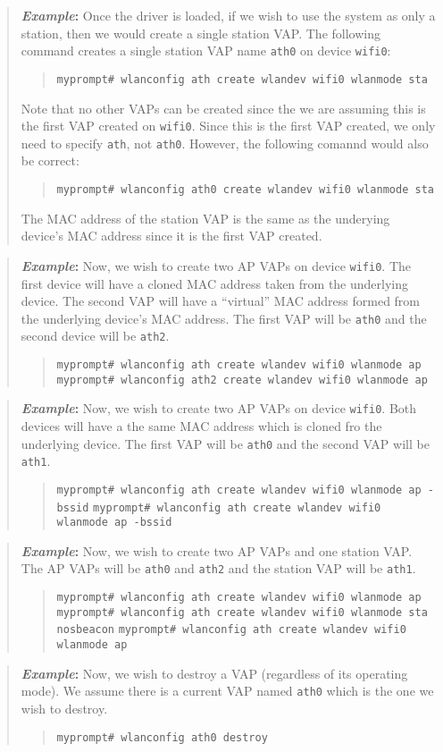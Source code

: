 \documentclass[10pt,fullpage]{article}
\newcommand{\mytt}[1]{{\texttt{#1}}}
\newcommand{\bv}{\begin{verse}}
\newcommand{\ev}{\end{verse}}
\newcommand{\cmd}[1]{{\texttt{myprompt\# #1}}}
\newenvironment{example}{\begin{quote}\textbf{\textit{Example}:}}{\end{quote}}
\begin{document}
\begin{example}
  Once the driver is loaded, if we wish to use the system as only a
  station, then we would create a single station VAP.  The following
  command creates a single station VAP name \mytt{ath0} on device
  \mytt{wifi0}:
  \bv
  \cmd{wlanconfig ath create wlandev wifi0 wlanmode sta}
  \ev
  Note that no other VAPs can be created since the we are assuming
  this is the first VAP created on \mytt{wifi0}.  Since this is the
  first VAP created, we only need to specify \mytt{ath}, not
  \mytt{ath0}.  However, the following comannd would also be correct:
  \bv
  \cmd{wlanconfig ath0 create wlandev wifi0 wlanmode sta}
  \ev
  The MAC address of the station VAP is the same as the underying
  device's MAC address since it is the first VAP created.
\end{example}
\begin{example}
  Now, we wish to create two AP VAPs on device \mytt{wifi0}.  The first
  device will have a cloned MAC address taken from the underlying
  device. The second VAP will have a ``virtual'' MAC address formed
  from the underlying device's MAC address.  The first VAP will be
  \mytt{ath0} and the second device will be \mytt{ath2}.
  \bv
  \cmd{wlanconfig ath create wlandev wifi0 wlanmode ap}\\
  \cmd{wlanconfig ath2 create wlandev wifi0 wlanmode ap}
  \ev
\end{example}
\begin{example}
  Now, we wish to create two AP VAPs on device \mytt{wifi0}.  Both
  devices will have a the same MAC address which is cloned fro the
  underlying device.  The first VAP will be \mytt{ath0} and the second
  VAP will be \mytt{ath1}.
  \bv
  \cmd{wlanconfig ath create wlandev wifi0 wlanmode ap -bssid}
  \cmd{wlanconfig ath create wlandev wifi0 wlanmode ap -bssid}
  \ev
\end{example}
\begin{example}
  Now, we wish to create two AP VAPs and one station VAP.  The AP VAPs
  will be \mytt{ath0} and \mytt{ath2} and the station VAP will be
  \mytt{ath1}.
  \bv
  \cmd{wlanconfig ath create wlandev wifi0 wlanmode ap}
  \cmd{wlanconfig ath create wlandev wifi0 wlanmode sta nosbeacon}
  \cmd{wlanconfig ath create wlandev wifi0 wlanmode ap}
  \ev
\end{example}
\begin{example}
  Now, we wish to destroy a VAP (regardless of its operating mode).
  We assume there is a current VAP named \mytt{ath0} which is the one
  we wish to destroy.
  \bv
  \cmd{wlanconfig ath0 destroy}
  \ev
\end{example}
\end{document}
